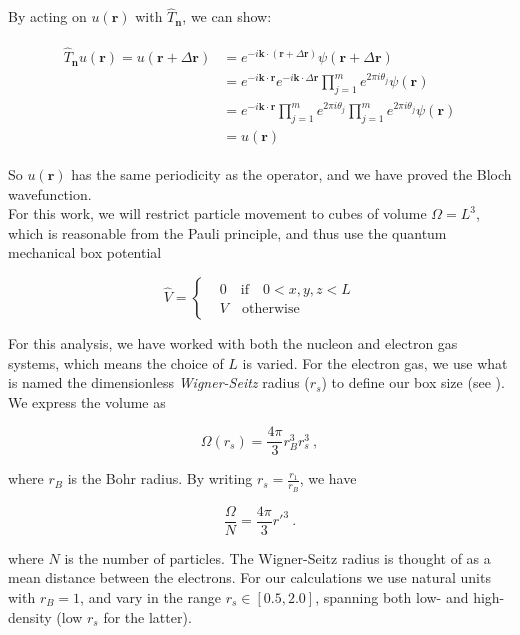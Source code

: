 \documentclass[10pt,twoside]{report}
\begin{document}
	By acting on $u(\bm{r})$ with $\hat{T}_{\bm{n}}$, we can show:
	
	\begin{align}
	\begin{split}
	\hat{T}_{\bm{n}}u(\bm{r}) = u(\bm{r} + \Delta\bm{r}) &= e^{-i\bm{k}\cdot(\bm{r}+\Delta\bm{r})}\psi(\bm{r}+\Delta\bm{r})\\
	&= e^{-i\bm{k}\cdot\bm{r}}e^{-i\bm{k}\cdot\Delta\bm{r}}\prod_{j=1}^me^{2\pi i\theta_j}\psi(\bm{r})\\
	&= e^{-i\bm{k}\cdot\bm{r}}\prod_{j=1}^me^{2\pi i\theta_j}\prod_{j=1}^me^{2\pi i\theta_j}\psi(\bm{r})\\
	&= u(\bm{r})
	\end{split}
	\end{align}
	
	So $u(\bm{r})$ has the same periodicity as the operator, and we have proved the Bloch wavefunction.\\
	
	For this work, we will restrict particle movement to cubes of volume $\Omega=L^3$, which is reasonable from the Pauli principle, and thus use the quantum mechanical box potential
	
	\begin{equation}
	\hat{V} = \begin{cases}
	&0 \quad\text{if}\quad 0<x,y,z<L \\
	&V \quad\text{otherwise}
	\end{cases}
	\end{equation}
	
	For this analysis, we have worked with both the nucleon and electron gas systems, which means the choice of $L$ is varied. For the electron gas, we use what is named the dimensionless \emph{Wigner-Seitz} radius ($r_s$) to define our box size (see \cite{Baardsen14}). We express the volume as
	
	\begin{equation}
		\Omega(r_s) = \frac{4\pi}{3}r_B^3r_s^3 \:,
	\end{equation}
	
	\noindent where $r_B$ is the Bohr radius. By writing $r_s = \frac{r_1}{r_B}$, we have
	
	\begin{equation}
	\frac{\Omega}{N} = \frac{4\pi}{3}r'^3 \:.
	\end{equation}
	
	\noindent where $N$ is the number of particles. The Wigner-Seitz radius is thought of as a mean distance between the electrons. For our calculations we use natural units with $r_B=1$, and vary in the range $r_s\in[0.5,2.0]$, spanning both low- and high-density (low $r_s$ for the latter).
	
\end{document}
